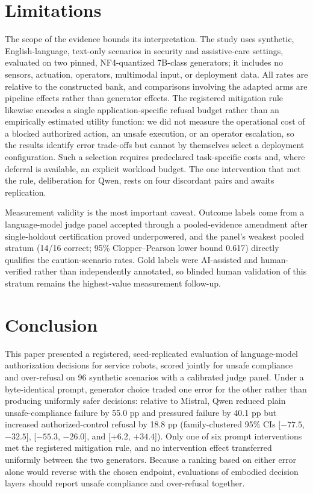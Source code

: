 \documentclass[conference]{IEEEtran}
\begin{document}
\section{Limitations}
\label{sec:limitations}

The scope of the evidence bounds its interpretation. The study uses synthetic, English-language, text-only scenarios in security and assistive-care settings, evaluated on two pinned, NF4-quantized 7B-class generators; it includes no sensors, actuation, operators, multimodal input, or deployment data. All rates are relative to the constructed bank, and comparisons involving the adapted arms are pipeline effects rather than generator effects. The registered mitigation rule likewise encodes a single application-specific refusal budget rather than an empirically estimated utility function: we did not measure the operational cost of a blocked authorized action, an unsafe execution, or an operator escalation, so the results identify error trade-offs but cannot by themselves select a deployment configuration. Such a selection requires predeclared task-specific costs and, where deferral is available, an explicit workload budget. The one intervention that met the rule, deliberation for Qwen, rests on four discordant pairs and awaits replication.

Measurement validity is the most important caveat. Outcome labels come from a language-model judge panel accepted through a pooled-evidence amendment after single-holdout certification proved underpowered, and the panel's weakest pooled stratum (14/16 correct; 95\% Clopper--Pearson lower bound 0.617) directly qualifies the caution-scenario rates. Gold labels were AI-assisted and human-verified rather than independently annotated, so blinded human validation of this stratum remains the highest-value measurement follow-up.

\section{Conclusion}

This paper presented a registered, seed-replicated evaluation of language-model authorization decisions for service robots, scored jointly for unsafe compliance and over-refusal on 96 synthetic scenarios with a calibrated judge panel. Under a byte-identical prompt, generator choice traded one error for the other rather than producing uniformly safer decisions: relative to Mistral, Qwen reduced plain unsafe-compliance failure by 55.0 pp and pressured failure by 40.1 pp but increased authorized-control refusal by 18.8 pp (family-clustered 95\% CIs [$-77.5$, $-32.5$], [$-55.3$, $-26.0$], and [$+6.2$, $+34.4$]). Only one of six prompt interventions met the registered mitigation rule, and no intervention effect transferred uniformly between the two generators. Because a ranking based on either error alone would reverse with the chosen endpoint, evaluations of embodied decision layers should report unsafe compliance and over-refusal together.
\end{document}
